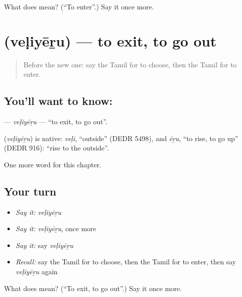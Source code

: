 \begin{tcolorbox}[breakable,colback=teal!4,colframe=teal!35!black,title={Before you move on}]
What does  mean? (\textquotedblleft{}To enter\textquotedblright{}.) Say it once more.
\end{tcolorbox}
\section[\texorpdfstring{\ta{வெளியேறு} (veḷiyēṟu)}{வெளியேறு (veḷiyēṟu)}]{ (veḷiyēṟu) — to exit, to go out}

\label{lesson:TA-C254-veliyeru}



\begin{quote}
Before the new one: say the Tamil for to choose, then the Tamil for to enter.
\end{quote}

\subsection*{You'll want to know: }
\textbf{} — \emph{veḷiyēṟu} — \textquotedblleft{}to exit, to go out\textquotedblright{}.

\begin{cousinweb}
\textbf{} (\emph{veḷiyēṟu}) is native: \emph{veḷi}, \textquotedblleft{}outside\textquotedblright{} (DEDR 5498), and \emph{ēṟu}, \textquotedblleft{}to rise, to go up\textquotedblright{} (DEDR 916): \textquotedblleft{}rise to the outside\textquotedblright{}.
\end{cousinweb}

\begin{grammarlens}[title={What you've built}]
One more word for this chapter.
\end{grammarlens}

\subsection*{Your turn}
\begin{itemize}
\raggedright
  \item \emph{Say it:} \emph{veḷiyēṟu}
  \item \emph{Say it:} \emph{veḷiyēṟu}, once more
  \item \emph{Say it:} say \emph{veḷiyēṟu}
  \item \emph{Recall:} say the Tamil for to choose, then the Tamil for to enter, then say \emph{veḷiyēṟu} again
\end{itemize}

\begin{tcolorbox}[breakable,colback=teal!4,colframe=teal!35!black,title={Before you move on}]
What does  mean? (\textquotedblleft{}To exit, to go out\textquotedblright{}.) Say it once more.
\end{tcolorbox}
